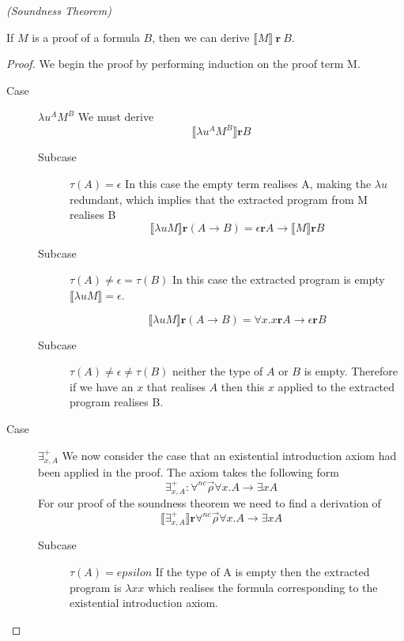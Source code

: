 \begin{mytheorem}
\emph{(Soundness Theorem)}

If $M$ is a proof of a formula $B$, then we can derive  $ \llbracket M \rrbracket \ \textbf{r} \ B$.

\begin{proof}

We begin the proof by performing induction on the proof term M.

\begin{description}

\item[Case] $\lambda u^A M^B$ We must derive $$\llbracket \lambda u^A M^B
  \rrbracket \textbf{r} B$$
   \begin{description}
     \item[Subcase] $\tau(A) = \epsilon$ In this case the empty term realises
       A, making the $\lambda u $ redundant, which implies that the extracted
       program from M realises B $$\llbracket \lambda u M \rrbracket
       \textbf{r} (A \to B) = \epsilon \textbf{r} A \to \llbracket M
       \rrbracket \textbf{r} B$$
     \item[Subcase] $\tau(A) \neq \epsilon = \tau (B)$ In this case the
       extracted program is empty $ \llbracket \lambda u M \rrbracket = \epsilon$.

       $$\llbracket \lambda u M \rrbracket \textbf{r} (A \to B) = \forall
       x. x \textbf{r} A \to \epsilon \textbf{r} B$$
     \item[Subcase]$\tau (A) \neq \epsilon \neq \tau (B)$ neither the type of $A$ or $B$ is empty. Therefore if we have an $x$ that
       realises $A$ then this $x$ applied to the extracted program realises B.
         

   \end{description}

\item[Case] $\exists^+_{x,A}$ We now consider the case that an existential
  introduction axiom had been applied in the proof. The axiom takes the
  following form $$\exists^+_{x,A}: \forall^{nc} \vec{\rho} \forall x. A \to
  \exists x A $$
  For our proof of the soundness theorem we need to find a derivation
  of $$\llbracket \exists^+_{x,A} \rrbracket \textbf{r} \forall^{nc}
  \vec{\rho} \forall x.A \to \exists x A$$

  \begin{description}
   
   \item[Subcase] $\tau (A) = epsilon$ If the type of A is empty then the
     extracted program is $\lambda x x$ which realises the formula
     corresponding to the existential introduction axiom.


\end{description}
\end{description}
\end{proof}
\end{mytheorem}
